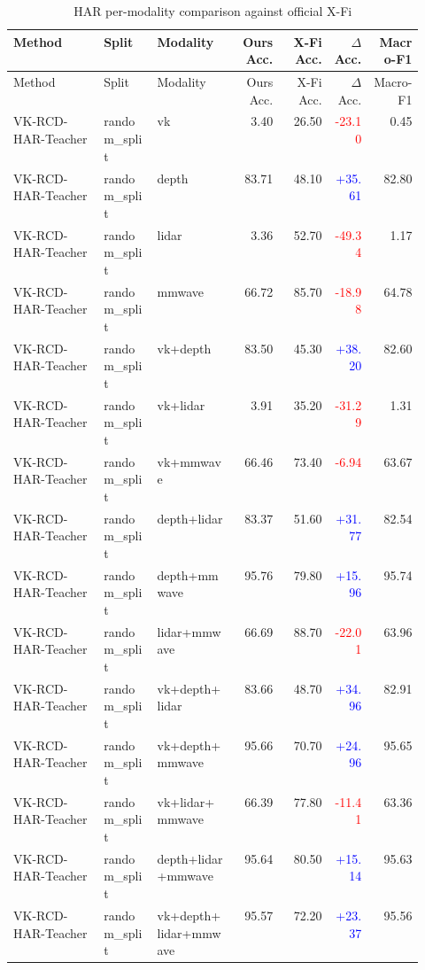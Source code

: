 \begin{longtable}{p{0.22\linewidth}p{0.13\linewidth}p{0.19\linewidth}rrrr}
\caption{HAR per-modality comparison against official X-Fi}\\
\toprule
Method & Split & Modality & Ours Acc. & X-Fi Acc. & $\Delta$ Acc. & Macro-F1\\\midrule
\endfirsthead
\toprule
Method & Split & Modality & Ours Acc. & X-Fi Acc. & $\Delta$ Acc. & Macro-F1\\\midrule
\endhead
VK-RCD-HAR-Teacher & random\_split & vk & 3.40 & 26.50 & \textcolor{red}{-23.10} & 0.45\\
VK-RCD-HAR-Teacher & random\_split & depth & 83.71 & 48.10 & \textcolor{blue}{+35.61} & 82.80\\
VK-RCD-HAR-Teacher & random\_split & lidar & 3.36 & 52.70 & \textcolor{red}{-49.34} & 1.17\\
VK-RCD-HAR-Teacher & random\_split & mmwave & 66.72 & 85.70 & \textcolor{red}{-18.98} & 64.78\\
VK-RCD-HAR-Teacher & random\_split & vk+depth & 83.50 & 45.30 & \textcolor{blue}{+38.20} & 82.60\\
VK-RCD-HAR-Teacher & random\_split & vk+lidar & 3.91 & 35.20 & \textcolor{red}{-31.29} & 1.31\\
VK-RCD-HAR-Teacher & random\_split & vk+mmwave & 66.46 & 73.40 & \textcolor{red}{-6.94} & 63.67\\
VK-RCD-HAR-Teacher & random\_split & depth+lidar & 83.37 & 51.60 & \textcolor{blue}{+31.77} & 82.54\\
VK-RCD-HAR-Teacher & random\_split & depth+mmwave & 95.76 & 79.80 & \textcolor{blue}{+15.96} & 95.74\\
VK-RCD-HAR-Teacher & random\_split & lidar+mmwave & 66.69 & 88.70 & \textcolor{red}{-22.01} & 63.96\\
VK-RCD-HAR-Teacher & random\_split & vk+depth+lidar & 83.66 & 48.70 & \textcolor{blue}{+34.96} & 82.91\\
VK-RCD-HAR-Teacher & random\_split & vk+depth+mmwave & 95.66 & 70.70 & \textcolor{blue}{+24.96} & 95.65\\
VK-RCD-HAR-Teacher & random\_split & vk+lidar+mmwave & 66.39 & 77.80 & \textcolor{red}{-11.41} & 63.36\\
VK-RCD-HAR-Teacher & random\_split & depth+lidar+mmwave & 95.64 & 80.50 & \textcolor{blue}{+15.14} & 95.63\\
VK-RCD-HAR-Teacher & random\_split & vk+depth+lidar+mmwave & 95.57 & 72.20 & \textcolor{blue}{+23.37} & 95.56\\

\end{longtable}
